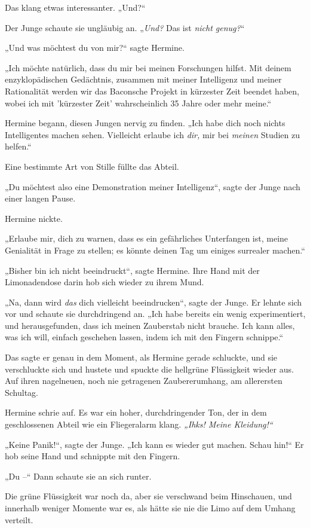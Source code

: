 Das klang etwas interessanter. „Und?“ 

Der Junge schaute sie ungläubig an. „\emph{Und?} Das ist \emph{nicht genug?}“ 

„Und was möchtest du von mir?“ sagte Hermine. 

„Ich möchte natürlich, dass du mir bei meinen Forschungen hilfst. Mit deinem enzyklopädischen Gedächtnis, zusammen mit meiner Intelligenz und meiner Rationalität werden wir das Baconsche Projekt in kürzester Zeit beendet haben, wobei ich mit 'kürzester Zeit' wahrscheinlich 35 Jahre oder mehr meine.“ 

Hermine begann, diesen Jungen nervig zu finden. „Ich habe dich noch nichts Intelligentes machen sehen. Vielleicht erlaube ich \emph{dir,} mir bei \emph{meinen} Studien zu helfen.“ 

Eine bestimmte Art von Stille füllte das Abteil. 

„Du möchtest also eine Demonstration meiner Intelligenz“, sagte der Junge nach einer langen Pause. 

Hermine nickte. 

„Erlaube mir, dich zu warnen, dass es ein gefährliches Unterfangen ist, meine Genialität in Frage zu stellen; es könnte deinen Tag um einiges surrealer machen.“ 

„Bisher bin ich nicht beeindruckt“, sagte Hermine. Ihre Hand mit der Limonadendose darin hob sich wieder zu ihrem Mund. 

„Na, dann wird \emph{das} dich vielleicht beeindrucken“, sagte der Junge. Er lehnte sich vor und schaute sie durchdringend an. „Ich habe bereits ein wenig experimentiert, und herausgefunden, dass ich meinen Zauberstab nicht brauche. Ich kann alles, was ich will, einfach geschehen lassen, indem ich mit den Fingern schnippe.“ 

Das sagte er genau in dem Moment, als Hermine gerade schluckte, und sie verschluckte sich und hustete und spuckte die hellgrüne Flüssigkeit wieder aus. Auf ihren nagelneuen, noch nie getragenen Zaubererumhang, am allerersten Schultag. 

Hermine schrie auf. Es war ein hoher, durchdringender Ton, der in dem geschlossenen Abteil wie ein Fliegeralarm klang. \emph{„Ihks! Meine Kleidung!“} 

„Keine Panik!“, sagte der Junge. „Ich kann es wieder gut machen. Schau hin!“ Er hob seine Hand und schnippte mit den Fingern. 

„Du –“ Dann schaute sie an sich runter. 

Die grüne Flüssigkeit war noch da, aber sie verschwand beim Hinschauen, und innerhalb weniger Momente war es, als hätte sie nie die Limo auf dem Umhang verteilt. 

